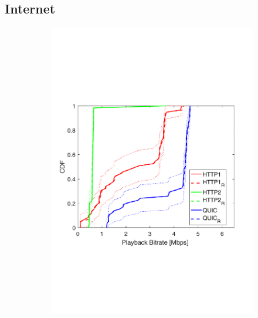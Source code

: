 \subsection{Internet}
\begin{figure}[t!]
\centering
\begin{subfigure}[t]{0.33\textwidth}
   \captionsetup{justification=centering,margin=4.5cm}
    \includegraphics[trim={0 7cm 0 7cm}, scale=0.25]{figures/CDF_bitrat_squad_ec2Mumbai_nd18.pdf}
     \caption{}
    \label{fig:ec2Mumbaibitrate}
  \end{subfigure}
  \begin{subfigure}[t]{0.33\textwidth}
  \captionsetup{justification=raggedright,singlelinecheck=false,margin=2.5cm}

\end{subfigure}
\end{figure}
